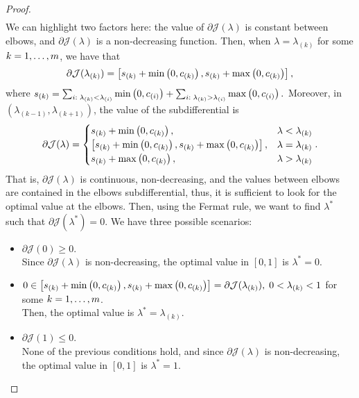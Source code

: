\begin{proof}
\begin{equation}
\begin{aligned}
        \end{aligned}        
    \end{equation}
    We can highlight two factors here: the value of $\partial \mathcal{J}(\lambda)$ is constant between elbows, and $\partial \mathcal{J}(\lambda)$ is a non-decreasing function.
    Then, when $\lambda = \lambda_{(k)}$ for some $k=1, \ldots, m$, we have that
    \begin{equation}
        \nonumber
        \partial \mathcal{J}(\lambda_{(k)}) = \left[ s_{(k)} + \min\left(0, c_{(k)}\right), s_{(k)} + \max\left(0, c_{(k)}\right)  \right] ,
    \end{equation}
    where $s_{(k)} = \sum_{i: \; \lambda_{(k)} < \lambda_{(i)}} \min\left(0, c_{(i)}\right) + \sum_{i: \; \lambda_{(k)} > \lambda_{(i)}} \max\left(0, c_{(i)}\right).$
    Moreover, in $(\lambda_{(k-1)}, \lambda_{(k+1)})$, the value of the subdifferential is
    \begin{equation}
        \nonumber
        \partial \mathcal{J}(\lambda) = \begin{cases}
            s_{(k)} + \min\left(0, c_{(k)}\right),& \lambda < \lambda_{(k)}\\
            \left[ s_{(k)} + \min\left(0, c_{(k)}\right), s_{(k)} + \max\left(0, c_{(k)}\right)   \right],& \lambda = \lambda_{(k)} \\
            s_{(k)} + \max\left(0, c_{(k)}\right),& \lambda > \lambda_{(k)}
        \end{cases} .
    \end{equation}
    That is, $\partial \mathcal{J}(\lambda)$ is continuous, non-decreasing, and the values between elbows are contained in the elbows subdifferential, thus, it is sufficient to look for the optimal value at the elbows.
    Then, using the Fermat rule, we want to find $\lambda^*$ such that $\partial \mathcal{J}(\lambda^*) = 0$. We have three possible scenarios:
    \begin{itemize}
        \item $\partial \mathcal{J}(0) \geq 0.$ 
        \\Since $\partial \mathcal{J}(\lambda)$ is non-decreasing, the optimal value in $[0, 1]$ is $\lambda^* = 0$.
        \item $0 \in \left[ s_{(k)} + \min\left(0, c_{(k)}\right), s_{(k)} + \max\left(0, c_{(k)}\right)   \right] = \partial \mathcal{J}(\lambda_{(k)}), \; 0 < \lambda_{(k)} < 1$ for some $k=1, \ldots, m$. 
        \\Then, the optimal value is $\lambda^*=\lambda_{(k)}$.
        \item $\partial \mathcal{J}(1) \leq 0$. 
        \\None of the previous conditions hold, and since $\partial \mathcal{J}(\lambda)$ is non-decreasing, the optimal value in $[0, 1]$ is $\lambda^* = 1$.
    \end{itemize}
\end{proof}
